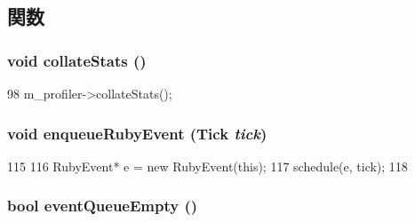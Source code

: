 \subsection{関数}
\hypertarget{classRubySystem_a208669cbc0bb1d52565956ca8c690c55}{
\subsubsection[{collateStats}]{\setlength{\rightskip}{0pt plus 5cm}void collateStats ()}}
\label{classRubySystem_a208669cbc0bb1d52565956ca8c690c55}



\begin{DoxyCode}
98 { m_profiler->collateStats(); }
\end{DoxyCode}
\hypertarget{classRubySystem_a14b5a6783cc1c4f01aef58ab8ddaf46e}{
\subsubsection[{enqueueRubyEvent}]{\setlength{\rightskip}{0pt plus 5cm}void enqueueRubyEvent ({\bf Tick} {\em tick})}}
\label{classRubySystem_a14b5a6783cc1c4f01aef58ab8ddaf46e}



\begin{DoxyCode}
115     {
116         RubyEvent* e = new RubyEvent(this);
117         schedule(e, tick);
118     }
\end{DoxyCode}
\hypertarget{classRubySystem_a89b51bcc3a463cd78acf62b3fc66288f}{
\subsubsection[{eventQueueEmpty}]{\setlength{\rightskip}{0pt plus 5cm}bool eventQueueEmpty ()}}
\label{classRubySystem_a89b51bcc3a463cd78acf62b3fc66288f}



